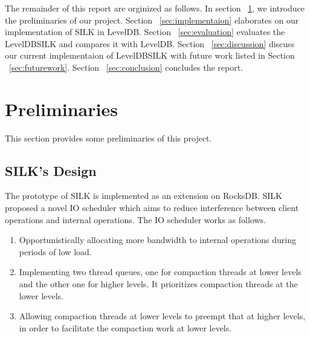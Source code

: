 \documentclass[letter,twocolumn,10pt]{article}
\begin{document}
The remainder of this report are orginized as follows. In section ~\ref{sec:preliminary}, we introduce the preliminaries of our project. Section ~\ref{sec:implementaion} elaborates on our implementation of SILK in LevelDB. Section ~\ref{sec:evaluation} evaluates the LevelDBSILK and compares it with LevelDB. Section ~\ref{sec:discussion} discuss our current implementaion of LevelDBSILK with future work listed in Section ~\ref{sec:futurework}. Section ~\ref{sec:conclusion} concludes the report.
\section{Preliminaries}
\label{sec:preliminary}
This section provides some preliminaries of this project.

\subsection {SILK's Design}
\label{sec:ioscheduler}
The prototype of SILK is implemented as an extension on RocksDB. SILK proposed a novel IO scheduler which aims to reduce interference between client operations and internal operations. The IO scheduler works as follows.
\begin{enumerate}
\item Opportunistically allocating more bandwidth to internal operations during periods of low load.
\item Implementing two thread queues, one for compaction threads at lower levels and the other one for higher levels. It prioritizes compaction threads at the lower levels.
\item Allowing compaction threads at lower levels to preempt that at higher levels, in order to facilitate the compaction work at lower levels.
\end{enumerate}

%
%
\end{document}
